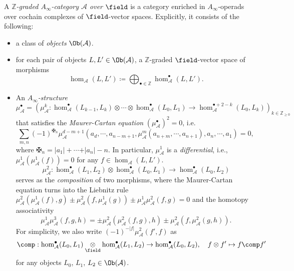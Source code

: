 \begin{dfn}
A
\emph{$\mathbb{Z}$-graded $A_{\infty}$-category $\mathcal{A}$
over $\field$}
is a category enriched in $A_{\infty}$-operads over cochain complexes of $\field$-vector spaces.
Explicitly, it consists of the following:
\begin{itemize}
\item
a class of \emph{objects} $\Ob(\mathcal{A})$.
\item for each pair of objects $L,L'\in\Ob (\mathcal{A})$, a $\mathbb{Z}$-graded $\field$-vector space of morphisms
$$
\hom_{\mathcal{A}}(L,L')\coloneqq \bigoplus_{\bullet\in\mathbb{Z}} \hom_{\mathcal{A}}^{\bullet}(L,L').
$$
\item An \emph{$A_{\infty}$-structure} \[
    \mu_{\mathcal{A}}^{\bullet} =\left(\mu_{\mathcal{A}}^k\colon\hom_{\mathcal{A}}^{\bullet} (L_{k-1},L_k)\otimes\dotsb\otimes\hom_{\mathcal{A}}^{\bullet} (L_0, L_1)\to\hom_{\mathcal{A}}^{\bullet +2-k} (L_0, L_k)\right)_{k\in\mathbb{Z}_{\geq 0}}
\]that satisfies the \emph{Maurer-Cartan equation} $(\mu_{\mathcal{A}}^{\bullet})^2=0$, i.e. \[
    \sum_{m,n}(-1)^{\maltese_n}\mu_{\mathcal{A}}^{d-m+1} (a_d,\dotsb, a_{n-m+1},\mu_{\mathcal{A}}^m (a_{n+m},\dotsb, a_{n+1}),a_n,\dotsb, a_1)=0,
\]where $\maltese_n =\vert a_1\vert+\dotsb+\vert a_n\vert -n$. In particular,
$\mu_{\mathcal{A}}^1$ is a \emph{differential},
i.e.,
$\mu_{\mathcal{A}}^1(\mu_{\mathcal{A}}^1(f))=0$
for any $f\in\hom_{\mathcal{A}}(L,L')$. \[
\mu_{\mathcal{A}}^2\colon\hom_{\mathcal{A}}^{\bullet} (L_1,L_2)\otimes\hom_{\mathcal{A}}^{\bullet} (L_0,L_1)\to\hom_{\mathcal{A}}^{\bullet} (L_0, L_2)
\]serves as the \emph{composition} of two morphisms, where the Maurer-Cartan equation turns into the Liebnitz rule $\mu_{\mathcal{A}}^2 (\mu_{\mathcal{A}}^1 (f),g)\pm\mu_{\mathcal{A}}^2 (f,\mu_{\mathcal{A}}^1 (g))\pm\mu_{\mathcal{A}}^1\mu_{\mathcal{A}}^2 (f,g)=0$ and the homotopy associativity \begin{equation}\label{eq:homotopy-associativity}
\mu^1_{\mathcal{A}}\mu_{\mathcal{A}}^3 (f,g,h)=\pm\mu_{\mathcal{A}}^2 (\mu_{\mathcal{A}}^2 (f,g),h)\pm\mu_{\mathcal{A}}^2 (f,\mu_{\mathcal{A}}^2 (g,h)).
\end{equation}
For simplicity, we also write $(-1)^{-\vert f\vert}\mu_{\mathcal{A}}^2 (f',f)$ as
$$
\comp
:
\hom_{\mathcal{A}}^{\bullet}(L_0,L_1)\underset{\field}{\otimes}\hom_{\mathcal{A}}^{\bullet}(L_1,L_2)
\rightarrow
\hom_{\mathcal{A}}^{\bullet}(L_0,L_2),
\quad
f\otimes f'
\mapsto
f\comp f'
$$
for any objects $L_0$, $L_1$, $L_2\in\Ob(\mathcal{A})$.

\end{itemize}
\end{dfn}
